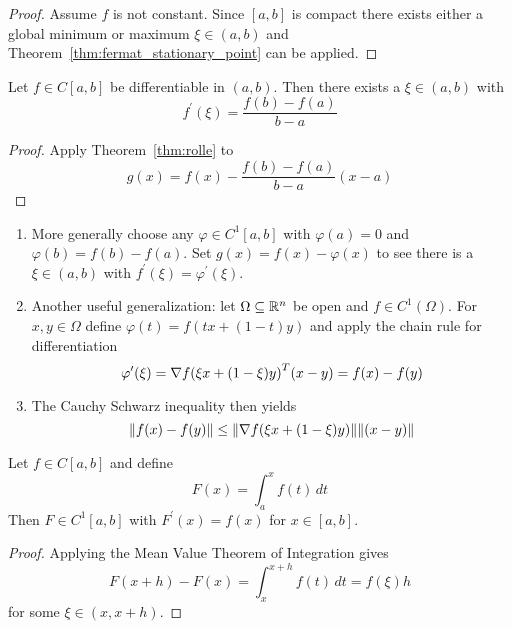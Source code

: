 \begin{proof}
Assume \( f \) is not constant. Since \( [a,b] \) is compact there exists either a global minimum or maximum 
\( \xi \in (a,b) \) and Theorem~\ref{thm:fermat_stationary_point} can be applied.
\end{proof}
\bigskip


\begin{theorem}\label{thm:mean_value}
Let \( f \in C[a,b] \) be differentiable in \( (a, b) \). Then there exists a \( \xi \in (a,b) \) with 
\[
    f^\prime(\xi) = \frac{f(b) - f(a)}{b - a}
\]
\end{theorem}

\begin{proof}
Apply Theorem~\ref{thm:rolle} to 
\[
    g(x) = f(x) - \frac{f(b) - f(a)}{b - a} (x -a) 
\]
\end{proof}
\bigskip

\begin{remark}\hfill
    \begin{enumerate}
        \item More generally choose any \( \varphi \in C^1[a,b] \) with \( \varphi(a) = 0 \) and 
            \( \varphi(b) = f(b) - f(a) \). Set \( g(x) = f(x) - \varphi(x) \) to see there is a \( \xi \in (a,b) \) 
            with \( f^\prime(\xi) = \varphi^\prime(\xi)\). 
        \item Another useful generalization: let \( \Omega \subseteq \mathbb{R}^n \) be open and \( f \in C^1(\Omega) \). For
            \( x, y \in \Omega \) define \( \varphi(t) = f(tx + (1 - t)y) \) and apply the chain rule for differentiation
            \[
                 \varphi^\prime(\xi) = \nabla {f(\xi x + (1 - \xi)y)}^T(x - y) = f(x) - f(y)
            \]
        \item The Cauchy Schwarz inequality then yields
            \[
                  \|f(x) - f(y)\| \le \|\nabla f(\xi x + (1 - \xi)y)\| \|(x - y)\|
            \]
    \end{enumerate}
\end{remark}
\bigskip

\begin{theorem}\label{thm:differentiation}
Let \( f \in C[a,b] \) and define 
\[
    F(x) = \int_a^x f(t)\,dt
\]
Then \( F \in C^1[a,b] \) with \( F^\prime(x) = f(x) \) for \( x \in [a,b] \).
\end{theorem}

\begin{proof}
Applying the Mean Value Theorem of Integration gives
\[
    F(x + h) - F(x) =  \int_x^{x + h} f(t)\,dt = f(\xi) h
\]
for some \( \xi \in (x, x + h) \).
\end{proof}
\bigskip

